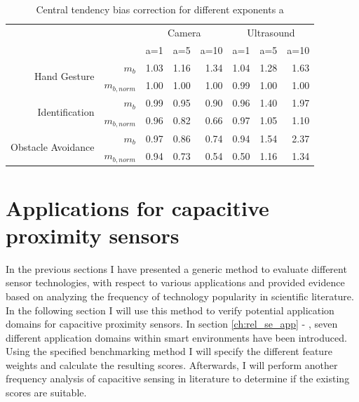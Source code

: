 \begin{table}[htbp]
  \centering
  \caption{Central tendency bias correction for different exponents a}
    \begin{tabular}{rrrrrrrr}
    \toprule
          &       & \multicolumn{3}{c}{Camera} & \multicolumn{3}{c}{Ultrasound} \\
          &       & a=1   & a=5   & a=10  & a=1   & a=5   & a=10 \\
    \midrule
    \multirow{2}[0]{*}{Hand Gesture} & $m_b$   & 1.03  & 1.16  & 1.34  & 1.04  & 1.28  & 1.63 \\
          & $m_{b,norm}$ & 1.00  & 1.00  & 1.00  & 0.99  & 1.00  & 1.00 \\
    \multirow{2}[0]{*}{Identification} & $m_b$   & 0.99  & 0.95  & 0.90  & 0.96  & 1.40  & 1.97 \\
          & $m_{b,norm}$ & 0.96  & 0.82  & 0.66  & 0.97  & 1.05  & 1.10 \\
    \multirow{2}[0]{*}{Obstacle Avoidance} & $m_b$  & 0.97  & 0.86  & 0.74  & 0.94  & 1.54  & 2.37 \\
          & $m_{b,norm}$ & 0.94  & 0.73  & 0.54  & 0.50  & 1.16  & 1.34 \\
    \bottomrule
    \end{tabular}%

  \label{tab:bench_bias_corr}%
\end{table}%


\section{Applications for capacitive proximity sensors}
\label{ch:benchmark_applications}
In the previous sections I have presented a generic method to evaluate different sensor technologies, with respect to various applications and provided evidence based on analyzing the frequency of technology popularity in scientific literature. In the following section I will use this method to verify potential application domains for capacitive proximity sensors. In section \ref{ch:rel_se_app} - \emph{}, seven different application domains within smart environments have been introduced. Using the specified benchmarking method I will specify the different feature weights and calculate the resulting scores. Afterwards, I will perform another frequency analysis of capacitive sensing in literature to determine if the existing scores are suitable. 

